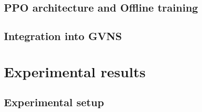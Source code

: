 \documentclass[preprint,12pt]{elsarticle}
\begin{document}
\subsection{PPO architecture and Offline training}



\subsection{Integration into GVNS}


\section{Experimental results}
\label{sec:results}


\subsection{Experimental setup}
\end{document}
